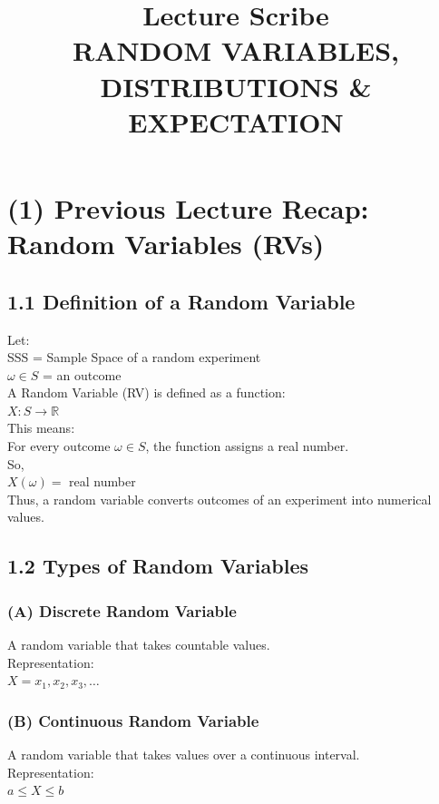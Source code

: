 \documentclass{article}
\begin{document}
\title{Lecture Scribe \\ RANDOM VARIABLES, DISTRIBUTIONS \& EXPECTATION}
\maketitle

\section{(1) Previous Lecture Recap: Random Variables (RVs)}

\subsection{1.1 Definition of a Random Variable}
Let: \\
SSS = Sample Space of a random experiment \\
$\omega\in S$ = an outcome \\
A Random Variable (RV) is defined as a function: \\
$X:S\rightarrow \mathbb{R}$ \\
This means: \\
For every outcome $\omega\in S$, the function assigns a real number. \\
So, \\
$X(\omega)=$ real number \\
Thus, a random variable converts outcomes of an experiment into numerical values.

\subsection{1.2 Types of Random Variables}

\subsubsection{(A) Discrete Random Variable}
A random variable that takes countable values. \\
Representation: \\
$X=x_1,x_2,x_3,\dots$

\subsubsection{(B) Continuous Random Variable}
A random variable that takes values over a continuous interval. \\
Representation: \\
$a\le X\le b$
\end{document}
